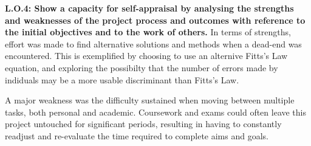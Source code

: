 		\textbf{L.O.4: Show a capacity for self-appraisal by analysing the strengths and weaknesses of the project process and outcomes with reference to the initial objectives and to the work of others.}
		In terms of strengths, effort was made to find alternative solutions and methods when a dead-end was encountered. This is exemplified by choosing to use an alternive Fitts's Law equation, and exploring the possibilty that the number of errors made by indiduals may be a more usable discriminant than Fitts's Law. 
		
		A major weakness was the difficulty sustained when moving between multiple tasks, both personal and academic. Coursework and exams could often leave this project untouched for significant periods, resulting in having to constantly readjust and re-evaluate the time required to complete aims and goals.
		
		
		
\newpage